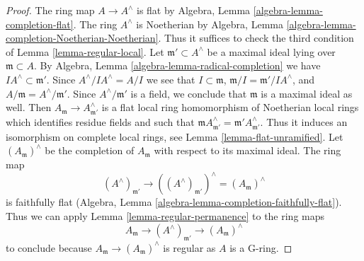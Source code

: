 \documentclass[10pt,a4paper]{amsart}
\theoremstyle{plain}
\theoremstyle{definition}
\theoremstyle{remark}
\numberwithin{equation}{subsection}
\begin{document}
\begin{proof}
The ring map $A \to A^\wedge$ is flat by
Algebra, Lemma \ref{algebra-lemma-completion-flat}.
The ring $A^\wedge$ is Noetherian by
Algebra, Lemma \ref{algebra-lemma-completion-Noetherian-Noetherian}.
Thus it suffices to check the third condition of
Lemma \ref{lemma-regular-local}.
Let $\mathfrak m' \subset A^\wedge$ be a maximal ideal lying over
$\mathfrak m \subset A$.
By Algebra, Lemma \ref{algebra-lemma-radical-completion}
we have $IA^\wedge \subset \mathfrak m'$.
Since $A^\wedge/IA^\wedge = A/I$ we see that
$I \subset \mathfrak m$, $\mathfrak m/I = \mathfrak m'/IA^\wedge$, and
$A/\mathfrak m = A^\wedge/\mathfrak m'$. Since $A^\wedge/\mathfrak m'$
is a field, we conclude that $\mathfrak m$ is a maximal ideal as well.
Then $A_\mathfrak m \to A^\wedge_{\mathfrak m'}$ is a flat local
ring homomorphism of Noetherian local rings
which identifies residue fields and such that
$\mathfrak m A^\wedge_{\mathfrak m'} = \mathfrak m'A^\wedge_{\mathfrak m'}$.
Thus it induces an isomorphism on complete local rings, see
Lemma \ref{lemma-flat-unramified}.
Let $(A_\mathfrak m)^\wedge$ be the completion of $A_\mathfrak m$
with respect to its maximal ideal.
The ring map
$$
(A^\wedge)_{\mathfrak m'} \to
((A^\wedge)_{\mathfrak m'})^\wedge = (A_\mathfrak m)^\wedge
$$
is faithfully flat (Algebra, Lemma
\ref{algebra-lemma-completion-faithfully-flat}). Thus we can apply
Lemma \ref{lemma-regular-permanence} to the ring maps
$$
A_\mathfrak m \to (A^\wedge)_{\mathfrak m'} \to (A_\mathfrak m)^\wedge
$$
to conclude because $A_\mathfrak m \to (A_\mathfrak m)^\wedge$
is regular as $A$ is a G-ring.
\end{proof}
\end{document}
